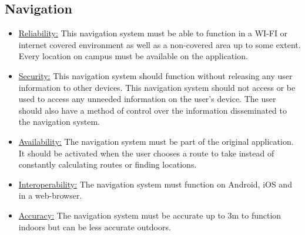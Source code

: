 \documentclass[runningheads,a4paper]{article}
\begin{document}
\subsection{Navigation}
\begin{itemize}
\item \underline{Reliability:} 
This navigation system must be able to function in a WI-FI or internet covered environment as well as a non-covered area up to some extent. Every location on campus must be available on the application. 

\item \underline{Security:}
This navigation system should function without releasing any user information to other devices. This navigation system should not access or be used to access any unneeded information on the user’s device. The user should also have a method of control over the information disseminated to the navigation system.

\item \underline{Availability:}
The navigation system must be part of the original application. It should be activated when the user chooses a route to take instead of constantly calculating routes or finding locations. 

\item \underline{Interoperability:}
The navigation system must function on Android, iOS and in a web-browser.

\item \underline{Accuracy:}
The navigation system must be accurate up to 3m to function indoors but can be less accurate outdoors. 
\end{itemize}
\end{document}

